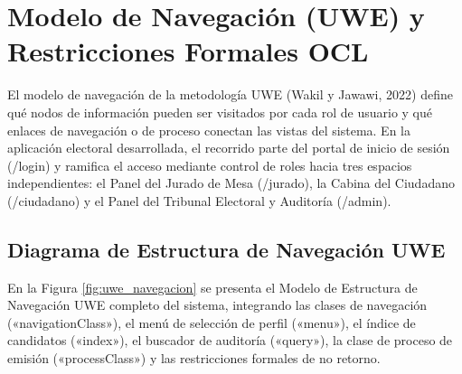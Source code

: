 \section{Modelo de Navegación (UWE) y Restricciones Formales OCL}
\label{sec:modelo_navegacion_uwe}

El modelo de navegación de la metodología UWE (Wakil y Jawawi, 2022) define qué nodos de información pueden ser visitados por cada rol de usuario y qué enlaces de navegación o de proceso conectan las vistas del sistema. En la aplicación electoral desarrollada, el recorrido parte del portal de inicio de sesión (/login) y ramifica el acceso mediante control de roles hacia tres espacios independientes: el Panel del Jurado de Mesa (/jurado), la Cabina del Ciudadano (/ciudadano) y el Panel del Tribunal Electoral y Auditoría (/admin).

\subsection{Diagrama de Estructura de Navegación UWE}
\label{subsec:diagrama_navegacion_uwe}

En la Figura \ref{fig:uwe_navegacion} se presenta el Modelo de Estructura de Navegación UWE completo del sistema, integrando las clases de navegación («navigationClass»), el menú de selección de perfil («menu»), el índice de candidatos («index»), el buscador de auditoría («query»), la clase de proceso de emisión («processClass») y las restricciones formales de no retorno.

